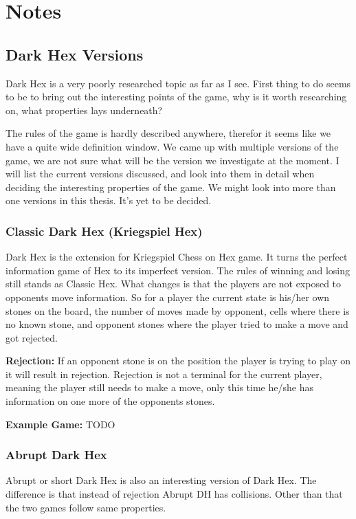 \section{Notes} \label{section:notes}

\subsection{Dark Hex Versions}

Dark Hex is a very poorly researched topic as far as I see. First thing to do seems to be to bring out the interesting points of the game, why is it worth researching on, what properties lays underneath?

The rules of the game is hardly described anywhere, therefor it seems like we have a quite wide definition window. We came up with multiple versions of the game, we are not sure what will be the version we investigate at the moment.
I will list the current versions discussed, and look into them in detail when deciding the interesting properties of the game. We might look into more than one versions in this thesis. It's yet to be decided.

\subsubsection{Classic Dark Hex (Kriegspiel Hex)}
Dark Hex is the extension for Kriegspiel Chess on Hex game. It turns the perfect information game of Hex to its imperfect version. The rules of winning and losing still stands as Classic Hex. What changes is that the players are not exposed to opponents move information. So for a player the current state is his/her own stones on the board, the number of moves made by opponent, cells where there is no known stone, and opponent stones where the player tried to make a move and got rejected.

{\bf Rejection:} If an opponent stone is on the position the player is trying to play on it will result in rejection. Rejection is not a terminal for the current player, meaning the player still needs to make a move, only this time he/she has information on one more of the opponents stones.

{\bf Example Game:}
TODO

\subsubsection{Abrupt Dark Hex}

Abrupt or short Dark Hex is also an interesting version of Dark Hex. The difference is that instead of rejection Abrupt DH has collisions. Other than that the two games follow same properties.

